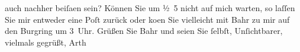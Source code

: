 \begin{ledgroupsized}[t]{13cm}
               auch nachher beiſa{\geminationm}en sein? Können Sie um
                  ½ 5 nicht auf mich warten, so laſſen Sie mir entweder eine Poſt
               zurück oder ko{\geminationm}en Sie vielleicht mit Bahr zu mir auf den Burgring
               um 3 Uhr. Grüßen Sie Bahr und seien
               Sie ſelbſt, Unſichtbarer, vielmals gegrüßt, \spacefill\mbox{Arth}\pend
                     \endnumbering{}\end{ledgroupsized}  \newcommand{\dateiname}{L00101}\newcommand{\titel}{Arthur Schnitzler an Hugo von Hofmannsthal, [7. 5. 1892]}\newcommand{\editorInnen}{ Martin Anton Müller und Gerd-Hermann Susen}
            \footnotesize
\begin{ledgroupsized}[t]{11.5cm}
\end{ledgroupsized}
         
      